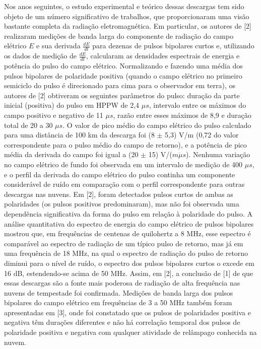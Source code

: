 \documentclass[a4paper, 12pt, onecolumn,singlespacing]{article}
\begin{document}
	Nos anos seguintes, o estudo experimental e teórico dessas descargas tem sido objeto de um número significativo de trabalhos, que proporcionaram uma visão bastante completa da radiação eletromagnética. Em particular, os autores de [2] realizaram medições de banda larga do componente de radiação do campo elétrico $E$ e sua derivada $\frac{dE}{dt}$ para dezenas de pulsos bipolares curtos e, utilizando os dados de medição de $\frac{dE}{dt}$, calcularam as densidades espectrais de energia e potência do pulso do campo elétrico. Normalizando e fazendo uma média dos pulsos bipolares de polaridade positiva (quando o campo elétrico no primeiro semiciclo do pulso é direcionado para cima para o observador em terra), os autores de [2] obtiveram os seguintes parâmetros do pulso: duração da parte inicial (positiva) do pulso em HPPW de 2,4 $\mu s$, intervalo entre os máximos do campo positivo e negativo de 11 $\mu s$, razão entre esses máximos de 8,9 e duração total de 20 a 30 $\mu s$. O valor de pico médio do campo elétrico do pulso calculado para uma distância de 100 km da descarga foi (8 $\pm$ 5,3) V/m (0,72 do valor correspondente para o pulso médio do campo de retorno), e a potência de pico média da derivada do campo foi igual a (20 $\pm$ 15) V/($m \dot \mu s$). Nenhuma variação no campo elétrico de fundo foi observada em um intervalo de medição de 400 $\mu s$, e o perfil da derivada do campo elétrico do pulso continha um componente considerável de ruído em comparação com o perfil correspondente para outras descargas nas nuvens. Em [2], foram detectados pulsos curtos de ambas as polaridades (os pulsos positivos predominaram), mas não foi observada uma dependência significativa da forma do pulso em relação à polaridade do pulso. A análise quantitativa do espectro de energia do campo elétrico de pulsos bipolares mostrou que, em frequências de centenas de quilohertz a 8 MHz, esse espectro é comparável ao espectro de radiação de um típico pulso de retorno, mas já em uma frequência de 18 MHz, na qual o espectro de radiação do pulso de retorno diminui para o nível de ruído, o espectro dos pulsos bipolares curtos o excede em 16 dB, estendendo-se acima de 50 MHz. Assim, em [2], a conclusão de [1] de que essas descargas são a fonte mais poderosa de radiação de alta frequência nas nuvens de tempestade foi confirmada. Medições de banda larga dos pulsos bipolares do campo elétrico em frequências de 3 a 50 MHz também foram apresentadas em [3], onde foi constatado que os pulsos de polaridades positiva e negativa têm durações diferentes e não há correlação temporal dos pulsos de polaridade positiva e negativa com qualquer atividade de relâmpago conhecida na nuvem.
	
\end{document}
